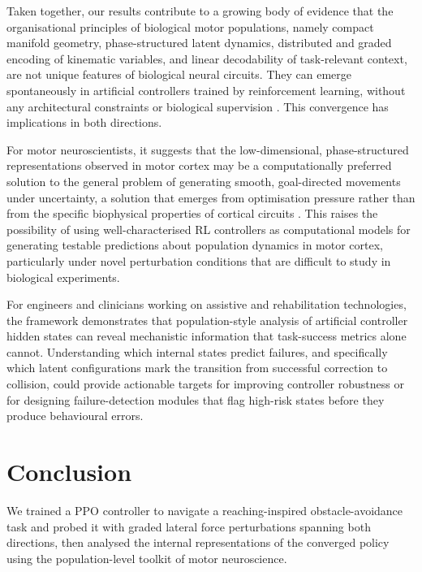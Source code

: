 \documentclass{article}
\begin{document}
Taken together, our results contribute to a growing body of evidence that
the organisational principles of biological motor populations, namely compact
manifold geometry, phase-structured latent dynamics, distributed and graded
encoding of kinematic variables, and linear decodability of task-relevant
context, are not unique features of biological neural circuits.
They can emerge spontaneously in artificial controllers trained by
reinforcement learning, without any architectural constraints or
biological supervision
\citep{Churchland2012,Gallego2017,Oby2019,Crevecoeur2019,Silver2016,Haarnoja2018,Mnih2015DQN}.
This convergence has implications in both directions.

For motor neuroscientists, it suggests that the low-dimensional, phase-structured
representations observed in motor cortex may be a computationally preferred
solution to the general problem of generating smooth, goal-directed
movements under uncertainty, a solution that emerges from optimisation
pressure rather than from the specific biophysical properties of cortical
circuits \citep{Franklin2011,WolpertGhahramani2000,Rizzolatti2001,Berniker2011}.
This raises the possibility of using well-characterised RL controllers
as computational models for generating testable predictions about
population dynamics in motor cortex, particularly under novel perturbation
conditions that are difficult to study in biological experiments.

For engineers and clinicians working on assistive and rehabilitation
technologies, the framework demonstrates that population-style analysis
of artificial controller hidden states can reveal mechanistic information
that task-success metrics alone cannot.
Understanding which internal states predict failures, and specifically
which latent configurations mark the transition from successful correction
to collision, could provide actionable targets for
improving controller robustness or for designing failure-detection modules
that flag high-risk states before they produce behavioural errors.

\section{Conclusion}

We trained a PPO controller to navigate a reaching-inspired
obstacle-avoidance task and probed it with graded lateral force
perturbations spanning both directions, then analysed the internal
representations of the converged policy using the population-level
toolkit of motor neuroscience.
\end{document}
